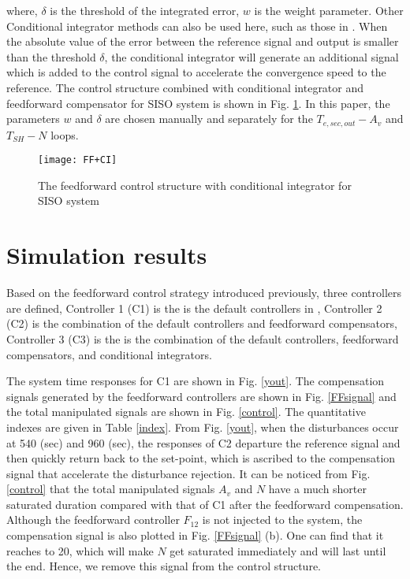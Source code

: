 \documentclass{ifacconf}
\begin{document}
where, $\delta$ is the threshold of the integrated error, $w$ is the weight parameter. Other Conditional integrator methods can also be used here, such as those in \cite{luo2010tuning}. When the absolute value of the error between the reference signal and output is smaller than the threshold $\delta$, the conditional integrator will generate an additional signal which is added to the control signal to accelerate the convergence speed to the reference. The control structure combined with conditional integrator and feedforward compensator for SISO system is shown in Fig. \ref{FF+CI}. In this paper, the parameters $w$ and $\delta$ are chosen manually and separately for the $T_{e,sec,out}-A_v$ and $T_{SH}-N$ loops.

\begin{figure}[htbp]
\begin{center}
\texttt{[image: FF+CI]}    %
\caption{The feedforward control structure with conditional integrator for SISO system}
\label{FF+CI}
\end{center}
\end{figure}


\section{Simulation results}
Based on the feedforward control strategy introduced previously, three controllers are defined, Controller 1 (C1) is the is the default controllers in \cite{Bejarano2018}, Controller 2 (C2) is the combination of the default controllers and feedforward compensators, Controller 3 (C3) is the is the combination of the default controllers, feedforward compensators, and conditional integrators.

The system time responses for C1 are shown in Fig. \ref{yout}. The compensation signals generated by the feedforward controllers are shown in Fig. \ref{FFsignal} and the total manipulated signals are shown in Fig. \ref{control}. The quantitative indexes are given in Table \ref{index}. From Fig. \ref{yout}, when the disturbances occur at 540 (sec) and 960 (sec), the responses of C2 departure the reference signal and then quickly return back to the set-point, which is ascribed to the compensation signal that accelerate the disturbance rejection. It can be noticed from Fig. \ref{control} that the total manipulated signals $A_v$ and $N$ have a much shorter saturated duration compared with that of C1 after the feedforward compensation. Although the feedforward controller $F_{12}$ is not injected to the system, the compensation signal is also plotted in Fig. \ref{FFsignal} (b). One can find that it reaches to 20, which will make $N$ get saturated immediately and will last until the end. Hence, we remove this signal from the control structure.
\end{document}
